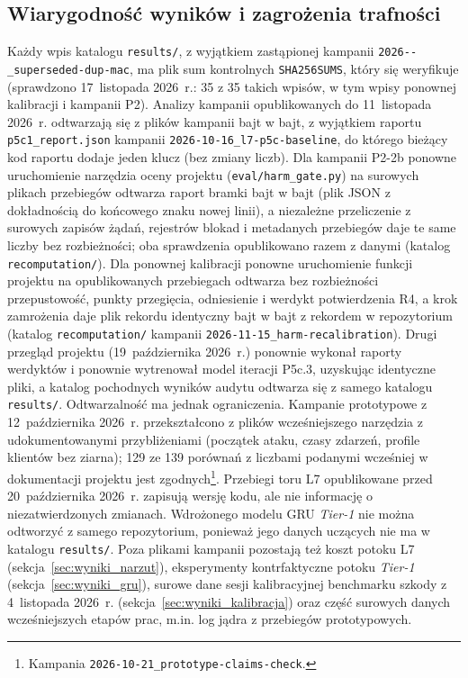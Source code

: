 \documentclass[a4paper,12pt]{article}
\begin{document}
\subsection{Wiarygodność wyników i zagrożenia trafności}\label{sec:wyniki_wiarygodnosc}
Każdy wpis katalogu \texttt{results/}, z wyjątkiem zastąpionej kampanii \texttt{2026--\_\allowbreak superseded-\allowbreak dup-\allowbreak mac}, ma plik sum kontrolnych \texttt{SHA256SUMS}, który się weryfikuje (sprawdzono 17~listopada 2026~r.: 35 z 35 takich wpisów, w tym wpisy ponownej kalibracji i kampanii P2). Analizy kampanii opublikowanych do 11~listopada 2026~r. odtwarzają się z plików kampanii bajt w bajt, z wyjątkiem raportu \texttt{p5c1\_report.json} kampanii \texttt{2026-10-16\_l7-p5c-baseline}, do którego bieżący kod raportu dodaje jeden klucz (bez zmiany liczb). Dla kampanii P2-2b ponowne uruchomienie narzędzia oceny projektu (\texttt{eval/\allowbreak harm\_gate.py}) na surowych plikach przebiegów odtwarza raport bramki bajt w bajt (plik JSON z dokładnością do końcowego znaku nowej linii), a niezależne przeliczenie z surowych zapisów żądań, rejestrów blokad i metadanych przebiegów daje te same liczby bez rozbieżności; oba sprawdzenia opublikowano razem z danymi (katalog \texttt{recomputation/}). Dla ponownej kalibracji ponowne uruchomienie funkcji projektu na opublikowanych przebiegach odtwarza bez rozbieżności przepustowość, punkty przegięcia, odniesienie i werdykt potwierdzenia R4, a krok zamrożenia daje plik rekordu identyczny bajt w bajt z rekordem w repozytorium (katalog \texttt{recomputation/} kampanii \texttt{2026-11-15\_\allowbreak harm-\allowbreak recalibration}). Drugi przegląd projektu (19~października 2026~r.) ponownie wykonał raporty werdyktów i ponownie wytrenował model iteracji P5c.3, uzyskując identyczne pliki, a katalog pochodnych wyników audytu odtwarza się z samego katalogu \texttt{results/}. Odtwarzalność ma jednak ograniczenia. Kampanie prototypowe z 12~października 2026~r. przekształcono z plików wcześniejszego narzędzia z udokumentowanymi przybliżeniami (początek ataku, czasy zdarzeń, profile klientów bez ziarna); 129 ze 139 porównań z liczbami podanymi wcześniej w dokumentacji projektu jest zgodnych\footnote{\raggedright Kampania \texttt{2026-10-21\_prototype-claims-check}.}. Przebiegi toru L7 opublikowane przed 20~października 2026~r. zapisują wersję kodu, ale nie informację o niezatwierdzonych zmianach. Wdrożonego modelu GRU \textit{Tier-1} nie można odtworzyć z samego repozytorium, ponieważ jego danych uczących nie ma w katalogu \texttt{results/}. Poza plikami kampanii pozostają też koszt potoku L7 (sekcja~\ref{sec:wyniki_narzut}), eksperymenty kontrfaktyczne potoku \textit{Tier-1} (sekcja~\ref{sec:wyniki_gru}), surowe dane sesji kalibracyjnej benchmarku szkody z 4~listopada 2026~r. (sekcja~\ref{sec:wyniki_kalibracja}) oraz część surowych danych wcześniejszych etapów prac, m.in. log jądra z przebiegów prototypowych.
\end{document}
